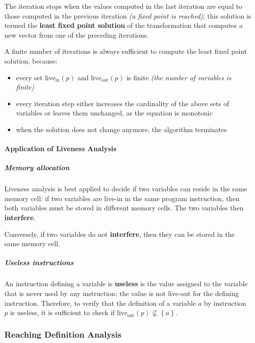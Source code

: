 \documentclass[english]{article}
\begin{document}
The iteration stops when the values computed in the last iteration are equal to those computed in the previous iteration \textit{(a fixed point is reached)};
this solution is termed the \textbf{least fixed point solution} of the transformation that computes a new vector from one of the preceding iterations.

A finite number of iterations is always sufficient to compute the least fixed point solution, because:

\begin{itemize}
  \item every set \(\text{live}_\text{in}\left( p \right)\) and \(\text{live}_\text{out}\left( p \right)\) is finite \textit{(the number of variables is finite)}
  \item every iteration step either increases the cardinality of the above sets of variables or leaves them unchanged, as the equation is monotonic
  \item when the solution does not change anymore, the algorithm terminates
\end{itemize}

\paragraph{Application of Liveness Analysis}

\subparagraph*{Memory allocation}

Liveness analysis is best applied to decide if two variables can reside in the same memory cell:
if two variables are live-in in the same program instruction, then both variables must be stored in different memory cells.
The two variables then \textbf{interfere}.

Conversely, if two variables do not \textbf{interfere}, then they can be stored in the same memory cell.

\subparagraph*{Useless instructions}

An instruction defining a variable is \textbf{useless} is the value assigned to the variable that is never used by any instruction:
the value is not live-out for the defining instruction.
Therefore, to verify that the definition of a variable \(a\) by instruction \(p\) is useless, it is sufficient to check if \(\text{live}_\text{out}\left( p \right) \not\subseteq \left\{ a \right\}\).

\subsubsection{Reaching Definition Analysis}
\end{document}
